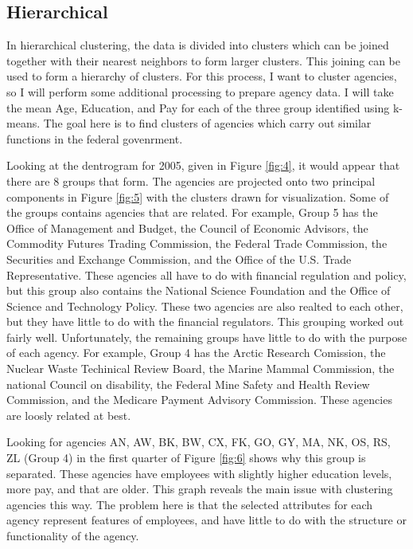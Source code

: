 \documentclass{article}
\begin{document}
    \subsection{Hierarchical}
    In hierarchical clustering, the data is divided into clusters which can be joined together with their nearest neighbors to form larger clusters. This joining can be used to form a hierarchy of clusters. For this process, I want to cluster agencies, so I will perform some additional processing to prepare agency data. I will take the mean Age, Education, and Pay for each of the three group identified using k-means. The goal here is to find clusters of agencies which carry out similar functions in the federal govenrment.
    \par
    Looking at the dentrogram for 2005, given in Figure \ref{fig:4}, it would appear that there are 8 groups that form. The agencies are projected onto two principal components in Figure \ref{fig:5} with the clusters drawn for visualization. Some of the groups contains agencies that are related. For example, Group 5 has the Office of Management and Budget, the Council of Economic Advisors, the Commodity Futures Trading Commission, the Federal Trade Commission, the Securities and Exchange Commission, and the Office of the U.S. Trade Representative. These agencies all have to do with financial regulation and policy, but this group also contains the National Science Foundation and the Office of Science and Technology Policy. These two agencies are also realted to each other, but they have little to do with the financial regulators. This grouping worked out fairly well. Unfortunately, the remaining groups have little to do with the purpose of each agency. For example, Group 4 has the Arctic Research Comission, the Nuclear Waste Techinical Review Board, the Marine Mammal Commission, the national Council on disability, the Federal Mine Safety and Health Review Commission, and the Medicare Payment Advisory Commission. These agencies are loosly related at best.
    \par
    Looking for agencies AN, AW, BK, BW, CX, FK, GO, GY, MA, NK, OS, RS, ZL (Group 4) in the first quarter of Figure \ref{fig:6} shows why this group is separated. These agencies have employees with slightly higher education levels, more pay, and that are older. This graph reveals the main issue with clustering agencies this way. The problem here is that the selected attributes for each agency represent features of employees, and have little to do with the structure or functionality of the agency.
    \par
\end{document}
